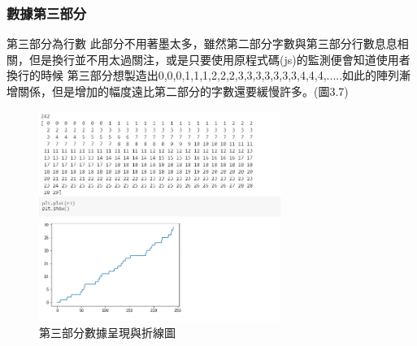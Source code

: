 \subsubsection{數據第三部分}
第三部分為行數 此部分不用著墨太多，雖然第二部分字數與第三部分行數息息相關，但是換行並不用太過關注，或是只要使用原程式碼(js)的監測便會知道使用者換行的時候
第三部分想製造出0,0,0,1,1,1,2,2,2,3,3,3,3,3,3,3,4,4,4,.....如此的陣列漸增關係，但是增加的幅度遠比第二部分的字數還要緩慢許多。(圖3.7)
\begin{figure}[H] %
	\centering %
	\includegraphics[width=0.7\textwidth]{3_2_1_5.png} %
	\caption{第三部分數據呈現與折線圖} %
	\label{Fig.3.7} %
\end{figure}